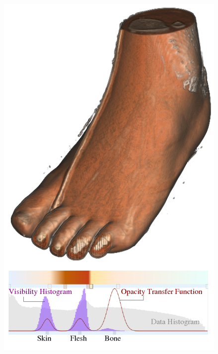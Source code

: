\documentclass{egpubl}
\begin{document}
\begin{figure}
	\centering
	\begin{minipage}{.24\textwidth}
		\includegraphics[width=1\linewidth]{images/correa_visibility-driven_2009_a}
	\end{minipage}~
	\begin{minipage}{.24\textwidth}

\end{minipage}
\end{figure}
\end{document}
